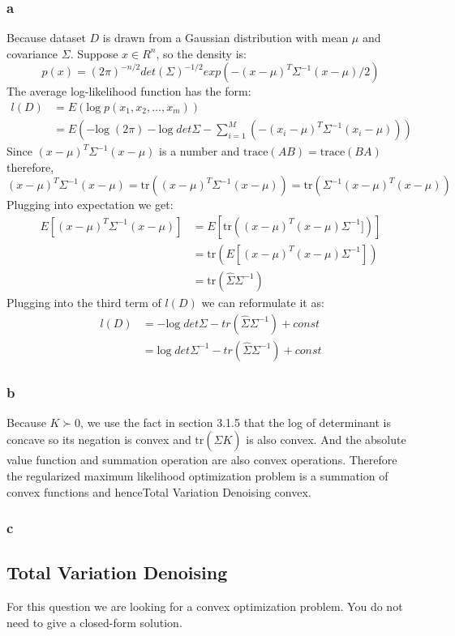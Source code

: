 \documentclass[10pt,a4paper]{article}
\begin{document}
\subsubsection{a}
Because dataset $D$ is drawn from a Gaussian distribution
with mean $\mu$ and covariance $\Sigma$. Suppose $x\in R^n$,
so the density is:
$$p(x) = (2\pi)^{-n/2}det(\Sigma)^{-1/2}exp(-(x-\mu)^T\Sigma^{-1}(x-\mu)/2)$$
The average log-likelihood function has the form:
\begin{align*}
  l(D) & = E(\text{log}\;p(x_1,x_2,\dots,x_m))\\
       & = E(-\text{log}\;(2\pi) - \text{log}\;det\Sigma
  - \sum_{i=1}^{M}(-(x_i-\mu)^T\Sigma^{-1}(x_i-\mu)))
\end{align*}
Since $(x-\mu)^T\Sigma^{-1}(x-\mu)$ is a number and
$\mathrm{trace}(AB)=\mathrm{trace}(BA)$ therefore,
$$(x-\mu)^T\Sigma^{-1}(x-\mu)= \mathrm{tr}((x-\mu)^T\Sigma^{-1}(x-\mu))=\mathrm{tr}(\Sigma^{-1}(x-\mu)^T(x-\mu))$$ 
Plugging into expectation we get:
\begin{align*}
E[(x-\mu)^T\Sigma^{-1}(x-\mu)] &= E[\mathrm{tr}((x-\mu)^T(x-\mu)\Sigma^{-1}] )] \\
&= \mathrm{tr}(E[(x-\mu)^T(x-\mu)\Sigma^{-1}])\\
&= \mathrm{tr}(\hat{\Sigma}\Sigma^{-1})
\end{align*}
Plugging into the third term of $l(D)$ we can reformulate it as:
\begin{align*}
     l(D) &=- \text{log}\;det\Sigma - tr(\hat{\Sigma}\Sigma^{-1} )+ const \\
       & = \text{log}\;det\Sigma^{-1} - tr(\hat{\Sigma}\Sigma^{-1} ) + const 
\end{align*}

\subsubsection{b}
Because $K\succ 0$, we use the fact in section
3.1.5\cite{boyd2004convex} that the log of determinant is
concave so its negation is convex and
$\mathrm{tr}(\hat{\Sigma}K)$ is also convex. And the
absolute value function and summation operation are also
convex operations. Therefore the regularized maximum likelihood
optimization problem is a summation of convex functions and
henceTotal Variation Denoising convex.

\subsubsection{c}

\subsection{Total Variation Denoising}
For this question we are looking for a convex optimization problem. You do not need to give a closed-form solution.


	\renewcommand\refname{Bibliography}
	
	
\end{document}
